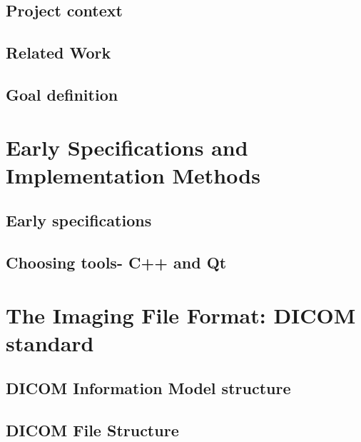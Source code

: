 \documentclass[11pt,twoside]{article}
\begin{document}
\subsection{Project context}


\clearpage
\subsection{Related Work}


\clearpage
\subsection{Goal definition}



\clearpage
\section{Early Specifications and Implementation Methods}

\subsection{Early specifications}


\clearpage
\subsection{Choosing tools- C++ and Qt}



\clearpage
\section{The Imaging File Format: DICOM standard }


\subsection{DICOM Information Model structure}


\clearpage
\subsection{DICOM File Structure}

\end{document}

